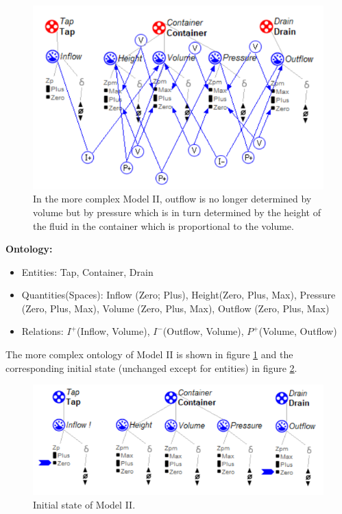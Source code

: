 \documentclass{article}
\begin{document}
\begin{figure}[!h]
	\centering
	\includegraphics{Extra_Flow.png}
	\caption{In the more complex Model II, outflow is no longer determined by volume but by pressure which is in turn determined by the height of the fluid in the container which is proportional to the volume.}
	\label{figure3}
\end{figure}

\textbf{Ontology:}
\begin{itemize}
	\item Entities: Tap, Container, Drain
	\item Quantities(Spaces): Inflow (Zero; Plus), Height(Zero, Plus, Max), Pressure (Zero, Plus, Max), Volume (Zero, Plus, Max), Outflow (Zero, Plus, Max)
	\item Relations: $I^+$(Inflow, Volume), $I^-$(Outflow, Volume), $P^+$(Volume, Outflow)
\end{itemize}

The more complex ontology of Model II is shown in figure \ref{figure3} and the corresponding initial state (unchanged except for entities) in figure \ref{figure4}.

\begin{figure}[!h]
	\centering
	\includegraphics{Scenario_2.png}
	\caption{Initial state of Model II.}
	\label{figure4}
\end{figure}
\end{document}
